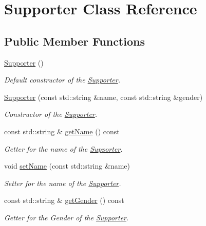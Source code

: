 \hypertarget{class_supporter}{}\section{Supporter Class Reference}
\label{class_supporter}
\subsection*{Public Member Functions}
\begin{DoxyCompactItemize}
\item 
\mbox{\label{class_supporter_a8978fd48c8dee1f7a3b023b5d20de611}} 
\mbox{\hyperlink{class_supporter_a8978fd48c8dee1f7a3b023b5d20de611}{Supporter}} ()
\begin{DoxyCompactList}\small\item\em Default constructor of the \mbox{\hyperlink{class_supporter}{Supporter}}. \end{DoxyCompactList}\item 
\mbox{\hyperlink{class_supporter_a930a75166ab9e6104c9a55d025289168}{Supporter}} (const std\+::string \&name, const std\+::string \&gender)
\begin{DoxyCompactList}\small\item\em Constructor of the \mbox{\hyperlink{class_supporter}{Supporter}}. \end{DoxyCompactList}\item 
const std\+::string \& \mbox{\hyperlink{class_supporter_a234ec754b73df8cf526fffbf8724b02c}{get\+Name}} () const
\begin{DoxyCompactList}\small\item\em Getter for the name of the \mbox{\hyperlink{class_supporter}{Supporter}}. \end{DoxyCompactList}\item 
void \mbox{\hyperlink{class_supporter_af192615aa7e4a17969f84448bca88498}{set\+Name}} (const std\+::string \&name)
\begin{DoxyCompactList}\small\item\em Setter for the name of the \mbox{\hyperlink{class_supporter}{Supporter}}. \end{DoxyCompactList}\item 
const std\+::string \& \mbox{\hyperlink{class_supporter_a8feebeba31cad1469d14063eb7ace9ba}{get\+Gender}} () const
\begin{DoxyCompactList}\small\item\em Getter for the Gender of the \mbox{\hyperlink{class_supporter}{Supporter}}. \end{DoxyCompactList}\item 

\end{DoxyCompactItemize}
